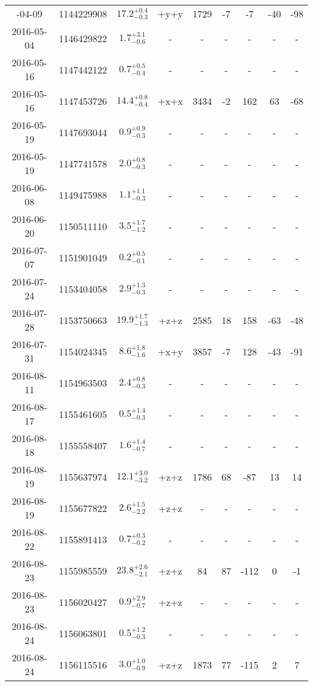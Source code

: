 \documentclass[preprint, trackchanges]{aastex61}
\begin{document}
\begin{longtable}{|c|c|c|c|c|c|c|c|c|}
		\hline
		\endlastfoot
	2016-04-09 & 1144229908 & $17.2^{+0.4}_{-0.3}$ & +y+y & 1729 & -7 & -7 & -40 & -98 \\
	2016-05-04 & 1146429822 & $ 1.7^{+3.1}_{-0.6}$ & - & - & - & - & - & - \\
	2016-05-16 & 1147442122 & $ 0.7^{+0.5}_{-0.4}$ & - & - & - & - & - & - \\
	2016-05-16 & 1147453726 & $14.4^{+0.8}_{-0.4}$ & +x+x & 3434 & -2 & 162 & 63 & -68 \\
	2016-05-19 & 1147693044 & $ 0.9^{+0.9}_{-0.3}$ & - & - & - & - & - & - \\
	2016-05-19 & 1147741578 & $ 2.0^{+0.8}_{-0.3}$ & - & - & - & - & - & - \\
	2016-06-08 & 1149475988 & $ 1.1^{+1.1}_{-0.3}$ & - & - & - & - & - & - \\
	2016-06-20 & 1150511110 & $ 3.5^{+1.7}_{-1.2}$ & - & - & - & - & - & - \\
	2016-07-07 & 1151901049 & $ 0.2^{+0.5}_{-0.1}$ & - & - & - & - & - & - \\
	2016-07-24 & 1153404058 & $ 2.9^{+1.3}_{-0.3}$ & - & - & - & - & - & - \\
	2016-07-28 & 1153750663 & $19.9^{+1.7}_{-1.3}$ & +z+z & 2585 & 18 & 158 & -63 & -48 \\
	2016-07-31 & 1154024345 & $ 8.6^{+1.8}_{-1.6}$ & +x+y & 3857 & -7 & 128 & -43 & -91 \\
	2016-08-11 & 1154963503 & $ 2.4^{+0.8}_{-0.3}$ & - & - & - & - & - & - \\
	2016-08-17 & 1155461605 & $ 0.5^{+1.4}_{-0.3}$ & - & - & - & - & - & - \\
	2016-08-18 & 1155558407 & $ 1.6^{+1.4}_{-0.7}$ & - & - & - & - & - & - \\
	2016-08-19 & 1155637974 & $12.1^{+3.0}_{-3.2}$ & +z+z & 1786 & 68 & -87 & 13 & 14 \\
	2016-08-19 & 1155677822 & $ 2.6^{+1.5}_{-2.2}$ & +z+z & - & - & - & - & - \\
	2016-08-22 & 1155891413 & $ 0.7^{+0.3}_{-0.2}$ & - & - & - & - & - & - \\
	2016-08-23 & 1155985559 & $23.8^{+2.6}_{-2.1}$ & +z+z & 84 & 87 & -112 & 0 & -1 \\
	2016-08-23 & 1156020427 & $ 0.9^{+2.9}_{-0.7}$ & +z+z & - & - & - & - & - \\
	2016-08-24 & 1156063801 & $ 0.5^{+1.2}_{-0.3}$ & - & - & - & - & - & - \\
	2016-08-24 & 1156115516 & $ 3.0^{+1.0}_{-0.9}$ & +z+z & 1873 & 77 & -115 & 2 & 7 \\

\end{longtable}
\end{document}
